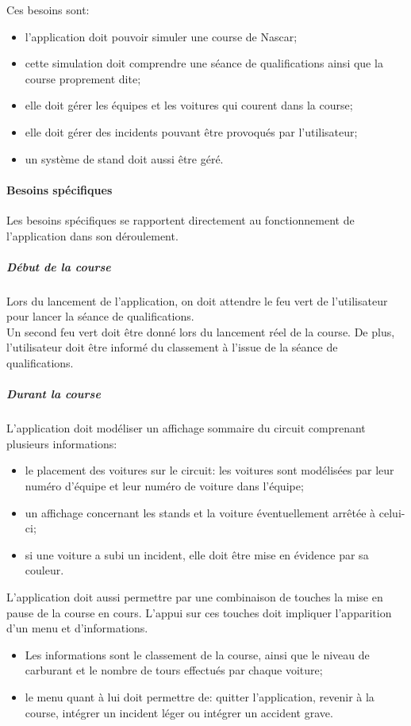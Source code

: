 \documentclass[a4paper, 11pt]{article}
\begin{document}
			Ces besoins sont:
			\begin{itemize}
				\item l'application doit pouvoir simuler une course de Nascar; 
				\item cette simulation doit comprendre une séance de qualifications ainsi que la course proprement dite;
				\item elle doit gérer les équipes et les voitures qui courent dans la course;
				\item elle doit gérer des incidents pouvant être provoqués par l'utilisateur;
				\item un système de stand doit aussi être géré.
			\end{itemize}
			
			\paragraph{Besoins spécifiques\\}
			
			Les besoins spécifiques se rapportent directement au fonctionnement de l'application dans son déroulement.
			
				\subparagraph{Début de la course}
				Lors du lancement de l'application, on doit attendre le feu vert de l'utilisateur pour lancer la séance de qualifications. \\
				Un second feu vert doit être donné lors du lancement réel de la course. De plus, l'utilisateur doit être informé du classement à l'issue de la séance de qualifications.
			
			
				\subparagraph{Durant la course}
				
				L'application doit modéliser un affichage sommaire du circuit comprenant plusieurs informations:
				\begin{itemize}
					\item le placement des voitures sur le circuit: les voitures sont modélisées par leur numéro d'équipe et leur numéro de voiture dans l'équipe;
					\item un affichage concernant les stands et la voiture éventuellement arrêtée à celui-ci;
					\item si une voiture a subi un incident, elle doit être mise en évidence par sa couleur.\\
				\end{itemize}
				
				L'application doit aussi permettre par une combinaison de touches la mise en pause de la course en cours. L'appui sur ces touches doit impliquer l'apparition d'un menu et d'informations.
				\begin{itemize}
					\item Les informations sont le classement de la course, ainsi que le niveau de carburant et le nombre de tours effectués par chaque voiture;
					\item le menu quant à lui doit permettre de: quitter l'application, revenir à la course, intégrer un incident léger ou intégrer un accident grave.
\end{itemize}			
\end{document}
